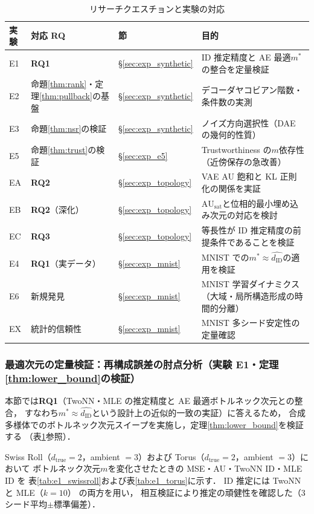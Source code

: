 \documentclass[12pt,a4paper]{jsarticle}
\newcommand{\dID}{d_{\mathrm{ID}}}
\newcommand{\dzopt}{m^*}                    %
\newcommand{\dtrue}{d_{\mathrm{true}}}
\newcommand{\AUsat}{\mathrm{AU}_{\mathrm{sat}}}
\begin{document}
\begin{table}[H]
\centering
\caption{リサーチクエスチョンと実験の対応}
\label{tab:rq_exp_map}
\begin{tabular}{lllp{3.5cm}}
\toprule
実験 & 対応 RQ & 節 & 目的 \\
\midrule
E1 & \textbf{RQ1} & §\ref{sec:exp_synthetic} & ID 推定精度と AE 最適$\dzopt$の整合を定量検証 \\
E2 & 命題\ref{thm:rank}・定理\ref{thm:pullback}の基盤 & §\ref{sec:exp_synthetic} & デコーダヤコビアン階数・条件数の実測 \\
E3 & 命題\ref{thm:nsr}の検証 & §\ref{sec:exp_synthetic} & ノイズ方向選択性（DAE の幾何的性質） \\
E5 & 命題\ref{thm:trust}の検証 & §\ref{sec:exp_e5} & Trustworthiness の$m$依存性（近傍保存の急改善） \\
EA & \textbf{RQ2} & §\ref{sec:exp_topology} & VAE AU 飽和と KL 正則化の関係を実証 \\
EB & \textbf{RQ2}（深化） & §\ref{sec:exp_topology} & $\AUsat$と位相的最小埋め込み次元の対応を検討 \\
EC & \textbf{RQ3} & §\ref{sec:exp_topology} & 等長性が ID 推定精度の前提条件であることを検証 \\
E4 & \textbf{RQ1}（実データ） & §\ref{sec:exp_mnist} & MNIST での$\dzopt \approx \hat{\dID}$の適用を検証 \\
E6 & 新規発見 & §\ref{sec:exp_mnist} & MNIST 学習ダイナミクス（大域・局所構造形成の時間的分離） \\
EX & 統計的信頼性 & §\ref{sec:exp_mnist} & MNIST 多シード安定性の定量確認 \\
\bottomrule
\end{tabular}
\end{table}

\subsubsection{最適次元の定量検証：再構成誤差の肘点分析（実験 E1・定理\ref{thm:lower_bound}の検証）}

本節では\textbf{RQ1}（TwoNN・MLE の推定精度と AE 最適ボトルネック次元との整合，
すなわち$\dzopt \approx \hat{\dID}$という設計上の近似的一致の実証）に答えるため，
合成多様体でのボトルネック次元スイープを実施し，定理\ref{thm:lower_bound}を検証する
（表\ref{tab:rq_exp_map}参照）．

Swiss Roll（$\dtrue = 2$，ambient $= 3$）および
Torus（$\dtrue = 2$，ambient $= 3$）において
ボトルネック次元$m$を変化させたときの MSE・AU・TwoNN ID・MLE ID を
表\ref{tab:e1_swissroll}および表\ref{tab:e1_torus}に示す．
ID 推定には TwoNN\cite{facco2017twonn} と MLE（$k=10$）\cite{levina2005mle} の両方を用い，
相互検証により推定の頑健性を確認した（3シード平均$\pm$標準偏差）．
\end{document}

